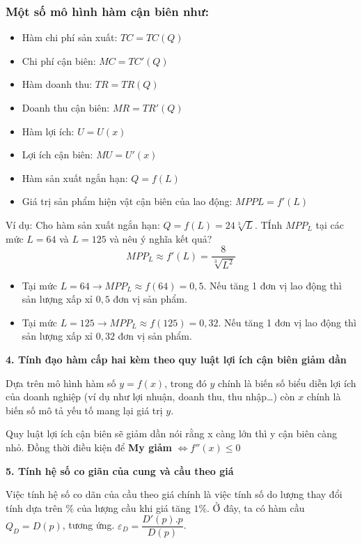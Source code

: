 \documentclass[12pt,a4paper]{report}
\begin{document}
\subsubsection{Một số mô hình hàm cận biên như:}
\begin{itemize}
    \item Hàm chi phí sản xuất: $TC = TC(Q)$
    \item Chi phí cận biên: $MC = TC'(Q)$
    \item Hàm doanh thu: $TR = TR(Q)$
    \item Doanh thu cận biên: $MR = TR'(Q)$
    \item Hàm lợi ích: $U = U(x)$
    \item Lợi ích cận biên: $MU = U'(x)$
    \item Hàm sản xuất ngắn hạn: $Q = f(L)$
    \item Giá trị sản phẩm hiện vật cận biên của lao động: $MPPL = f'(L)$
\end{itemize}
Ví dụ: Cho hàm sản xuất ngắn hạn: $Q = f(L) = 24\sqrt[3]{L}$. TÍnh $MPP_L$ tại các mức $L = 64$ và $L = 125$ và nêu ý nghĩa kết quả?
\[
    MPP_L \approx f'(L) = \frac{8}{\sqrt[3]{L^2}}    
\]
\begin{itemize}
    \item Tại mức $L = 64 \rightarrow MPP_L \approx f(64) = 0,5.$ Nếu tăng 1 đơn vị lao động thì sản lượng xấp xỉ $0,5$ đơn vị sản phẩm.
    \item Tại mức $L = 125 \rightarrow MPP_L \approx f(125) = 0,32.$ Nếu tăng 1 đơn vị lao động thì sản lượng xấp xỉ $0,32$ đơn vị sản phẩm.
\end{itemize}

\textbf{4. Tính đạo hàm cấp hai kèm theo quy luật lợi ích cận biên giảm dần}

Dựa trên mô hình hàm số $y= f(x)$, trong đó $y$ chính là biến số biểu diễn lợi ích của doanh nghiệp (ví dụ như lợi nhuận, doanh thu, thu nhập…) còn $x$ chính là biến số mô tả yếu tố mang lại giá trị $y$.

Quy luật lợi ích cận biên sẽ giảm dần nói rằng x càng lớn thì y cận biên càng nhỏ. Đồng thời điều kiện để \textbf{My giảm} $\Leftrightarrow f''(x) \leq 0$

\textbf{5. Tính hệ số co giãn của cung và cầu theo giá}

Việc tính hệ số co dãn của cầu theo giá chính là việc tính số do lượng thay đổi tính dựa trên $\%$ của lượng cầu khi giá tăng $1\%$. Ở đây, ta có hàm cầu $Q_D = D(p)$, tương ứng. $\varepsilon_D = \dfrac{D'(p). p}{D(p)}$.
\end{document}

